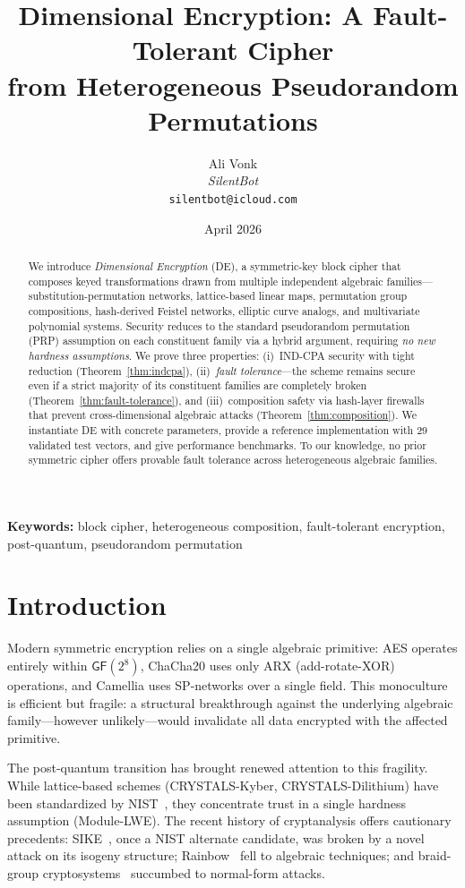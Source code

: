 \documentclass[11pt]{article}
\title{Dimensional Encryption: A Fault-Tolerant Cipher \\ from Heterogeneous Pseudorandom Permutations}
\author{Ali Vonk \\
\textit{SilentBot} \\
\texttt{silentbot@icloud.com}}
\date{April 2026}
\newcommand{\DE}{\textsf{DE}}
\begin{document}
\maketitle

\begin{abstract}
We introduce \emph{Dimensional Encryption} (\DE), a symmetric-key block cipher
that composes keyed transformations drawn from multiple independent algebraic
families---substitution-permutation networks, lattice-based linear maps,
permutation group compositions, hash-derived Feistel networks, elliptic curve
analogs, and multivariate polynomial systems. Security reduces to the standard
pseudorandom permutation (PRP) assumption on each constituent family via a
hybrid argument, requiring \emph{no new hardness assumptions}. We prove three
properties: (i)~IND-CPA security with tight reduction (Theorem~\ref{thm:indcpa}),
(ii)~\emph{fault tolerance}---the scheme remains secure even if a strict majority
of its constituent families are completely broken
(Theorem~\ref{thm:fault-tolerance}), and (iii)~composition safety via
hash-layer firewalls that prevent cross-dimensional algebraic attacks
(Theorem~\ref{thm:composition}). We instantiate \DE{} with concrete parameters,
provide a reference implementation with 29 validated test vectors, and give
performance benchmarks. To our knowledge, no prior symmetric cipher offers
provable fault tolerance across heterogeneous algebraic families.
\end{abstract}

\bigskip
\noindent\textbf{Keywords:} block cipher, heterogeneous composition,
fault-tolerant encryption, post-quantum, pseudorandom permutation

\section{Introduction}
\label{sec:intro}

Modern symmetric encryption relies on a single algebraic primitive: AES
operates entirely within $\textsf{GF}(2^8)$, ChaCha20 uses only ARX
(add-rotate-XOR) operations, and Camellia uses SP-networks over a single
field. This monoculture is efficient but fragile: a structural breakthrough
against the underlying algebraic family---however unlikely---would
invalidate all data encrypted with the affected primitive.

The post-quantum transition has brought renewed attention to this fragility.
While lattice-based schemes (CRYSTALS-Kyber, CRYSTALS-Dilithium) have
been standardized by NIST~\cite{nist-pqc}, they concentrate trust in a
single hardness assumption (Module-LWE). The recent history of cryptanalysis
offers cautionary precedents: SIKE~\cite{castryck2022}, once a NIST
alternate candidate, was broken by a novel attack on its isogeny structure;
Rainbow~\cite{beullens2022} fell to algebraic techniques; and braid-group
cryptosystems~\cite{dehornoy2006} succumbed to normal-form attacks.
\end{document}
